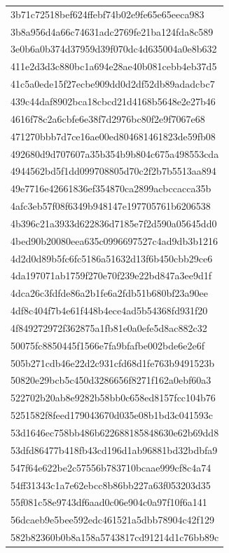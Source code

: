 \begin{tabular}{l}
3b71c72518bef624ffebf74b02e9fe65e65eeca983 \\
3b8a956d4a66c74631adc2769fe21ba124fda8c589 \\
3e0b6a0b374d37959d39f070dc4d635004a0e8b632 \\
411e2d3d3c880bc1a694e28ae40b081cebb4eb37d5 \\
41c5a0ede15f27ecbe909dd0d2df52db89adadcbc7 \\
439c44daf8902bca18cbcd21d4168b5648e2e27b46 \\
4616f78c2a6cbfe6e38f7d2976bc80f2e9f7067e68 \\
471270bbb7d7ce16ae00ed804681461823de59fb08 \\
492680d9d707607a35b354b9b804c675a498553cda \\
4944562bd5f1dd099708805d70c2f2b7b5513aa894 \\
49e7716e42661836ef354870ca2899acbccacca35b \\
4afc3eb57f08f6349b948147e197705761b6206538 \\
4b396c21a3933d622836d7185e7f2d590a05645dd0 \\
4bed90b20080eea635c0996697527c4ad9db3b1216 \\
4d2d0d89b5fc6fc5186a51632d13f6b450cbb29ce6 \\
4da197071ab1759f270e70f239e22bd847a3ee9d1f \\
4dca26c3fdfde86a2b1fe6a2fdb51b680bf23a90ee \\
4df8c404f7b4e61f448b4ece4ad5b54368fd931f20 \\
4f849272972f362875a1fb81e0a0efe5d8ac882c32 \\
50075fc8850445f1566e7fa9bfafbe002bde6e2e6f \\
505b271cdb46e22d2c931cfd68d1fe763b9491523b \\
50820e29bcb5c450d3286656f8271f162a0ebf60a3 \\
522702b20ab8e9282b58bb0c658ed8157fcc104b76 \\
5251582f8feed179043670d035e08b1bd3c041593c \\
53d1646ec758bb486b622688185848630e62b69dd8 \\
53dfd86477b418fb43cd196d1ab96881bd32bdbfa9 \\
547f64e622be2c57556b783710bcaae999cf8c4a74 \\
54ff31343c1a7e62ebcc8b86bb227a63f053203d35 \\
55f081c58e9743df6aad0c06e904c0a97f10f6a141 \\
56dcaeb9e5bee592edc461521a5dbb78904c42f129 \\
582b82360b0b8a158a5743817cd91214d1c76bb89c \\

\end{tabular}
